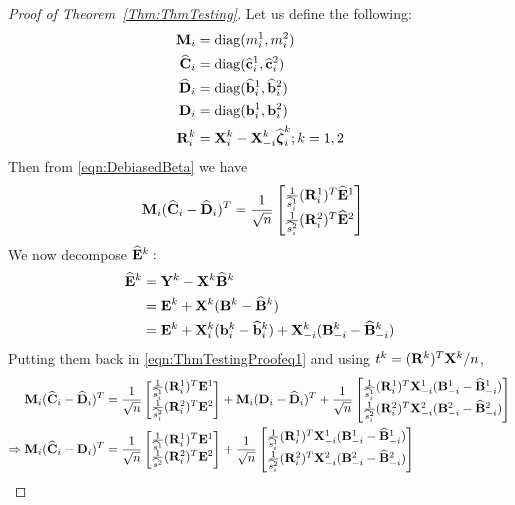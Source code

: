 \documentclass[12pt, letterpaper]{article}
\DeclareMathOperator*{\diag}{diag }
\numberwithin{equation}{section}
\begin{document}
\begin{proof}[Proof of Theorem~\ref{Thm:ThmTesting}]
Let us define the following:
%
\begin{align*}
\bfM_i &= \diag(m^1_i, m^2_i)\\
\widehat \bfC_i &= \diag(\widehat \bfc^1_i, \widehat \bfc^2_i)\\
\widehat \bfD_i &= \diag(\widehat \bfb^1_i, \widehat \bfb^2_i)\\
\bfD_i &= \diag(\bfb^1_i, \bfb^2_i)\\
\bfR_i^k &= \bfX_i^k - \bfX_{-i}^k \widehat \bfzeta_i^k; k = 1,2
\end{align*}
%
Then from \eqref{eqn:DebiasedBeta} we have
%
\begin{align}\label{eqn:ThmTestingProofeq1}
{\mathbf{M}}_i ( \widehat {{\mathbf{C}}}_i - \widehat {{\mathbf{D}}}_i )^T &= \frac{1}{\sqrt n}
\begin{bmatrix}
\frac{1}{\widehat s^1_i} ({\mathbf{R}}^1_i)^T \widehat {{\mathbf{E}}}^1 \\
\frac{1}{\widehat s^2_i} ({\mathbf{R}}^2_i)^T \widehat {{\mathbf{E}}}^2
\end{bmatrix}
\end{align}
%
We now decompose $\widehat {{\mathbf{E}}}^k:$
%
\begin{align*}
\widehat {{\mathbf{E}}}^k &= {\mathbf{Y}}^k - {\mathbf{X}}^k \widehat {{\mathbf{B}}}^k \\
&= {\mathbf{E}}^k + {\mathbf{X}}^k ({\mathbf{B}}^k - \widehat {{\mathbf{B}}}^k)\\
&= {\mathbf{E}}^k + {\mathbf{X}}_i^k ({\bf{b}}_i^k - \widehat {{\bf{b}}}_i^k) + {\mathbf{X}}_{-i}^k ({\mathbf{B}}_{-i}^k - \widehat {{\mathbf{B}}}_{-i}^k)
\end{align*}
%
Putting them back in \eqref{eqn:ThmTestingProofeq1} and using $t^k = ({\mathbf{R}}^k)^T {\mathbf{X}}^k/n$,
%
\begin{align}\label{eqn:ThmTestingProofeq2}
{\mathbf{M}}_i ( \widehat {{\mathbf{C}}}_i - \widehat {{\mathbf{D}}}_i)^T &= \frac{1}{\sqrt n}
\begin{bmatrix}
\frac{1}{\widehat s^1_i} ({\mathbf{R}}^1_i)^T {\mathbf{E}}^1 \\
\frac{1}{\widehat s^2_i} ({\mathbf{R}}^2_i)^T {\mathbf{E}}^2
\end{bmatrix} +
{\mathbf{M}}_i ({\mathbf{D}}_i - \widehat {{\mathbf{D}}}_i )^T +
\frac{1}{\sqrt n}
\begin{bmatrix}
\frac{1}{\widehat s^1_i} ({\mathbf{R}}^1_i)^T {\mathbf{X}}_{-i}^1 ({\mathbf{B}}_{-i}^1 - \widehat {{\mathbf{B}}}_{-i}^1) \\
\frac{1}{\widehat s^2_i} ({\mathbf{R}}^2_i)^T {\mathbf{X}}_{-i}^2 ({\mathbf{B}}_{-i}^2 - \widehat {{\mathbf{B}}}_{-i}^2)
\end{bmatrix}\\
\Rightarrow
{\mathbf{M}}_i ( \widehat {{\mathbf{C}}}_i - {\mathbf{D}}_i)^T &= \frac{1}{\sqrt n}
\begin{bmatrix}
\frac{1}{\widehat s^1} ({\mathbf{R}}^1_i)^T {\mathbf{E}}^1 \\
\frac{1}{\widehat s^2} ({\mathbf{R}}^2_i)^T {\mathbf{E}}^2
\end{bmatrix} +
\frac{1}{\sqrt n}
\begin{bmatrix}
\frac{1}{\widehat s^1_i} ({\mathbf{R}}^1_i)^T {\mathbf{X}}_{-i}^1 ({\mathbf{B}}_{-i}^1 - \widehat {{\mathbf{B}}}_{-i}^1) \\
\frac{1}{\widehat s^2_i} ({\mathbf{R}}^2_i)^T {\mathbf{X}}_{-i}^2 ({\mathbf{B}}_{-i}^2 - \widehat {{\mathbf{B}}}_{-i}^2)
\end{bmatrix}
\end{align}


\end{proof}
\end{document}
